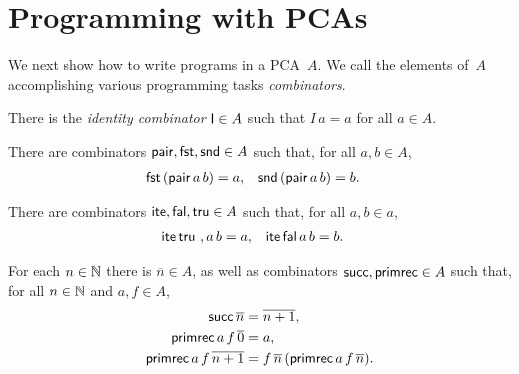 \section{Programming with PCAs}

We next show how to write programs in a PCA~$A$.
We call the elements of~$A$ accomplishing various programming tasks \emph{combinators}.

\begin{definition}[Identity]
  \label{def:combinator-I}
  \leanok
  There is the \emph{identity combinator} $\mathsf{I} \in A$ such that $I \, a = a$ for all $a \in A$.
\end{definition}

\begin{definition}[Pairing]
  \label{def:combinator-pairing}
  \leanok
  There are combinators $\mathsf{pair}, \mathsf{fst}, \mathsf{snd} \in A$ such that, for all $a, b \in A$,
  \begin{align*}
    \mathsf{fst}\, (\mathsf{pair}\,a\,b) &= a,
    &
    \mathsf{snd}\, (\mathsf{pair}\,a\,b) &= b.
  \end{align*}
\end{definition}

\begin{definition}[Booleans]
  \label{def:combinator-bool}
  There are combinators $\mathsf{ite} ,  \mathsf{fal}, \mathsf{tru} \in A$ such that, for all $a, b \in a$,
  \begin{align*}
    \mathsf{ite} \, \mathsf{tru} \ ,a \, b &= a,
    &
    \mathsf{ite} \, \mathsf{fal} \, a \, b &= b.
  \end{align*}
\end{definition}

\begin{definition}[Numerals]
  \label{def:combinator-nat}
  For each $n \in \mathbb{N}$ there is $\overline{n} \in A$, as well as combinators $\mathsf{succ}, \mathsf{primrec} \in A$
  such that, for all $n \in \mathbb{N}$ and $a, f \in A$,
  \begin{align*}
    \mathsf{succ} \, \overline{n} &= \overline{n+1},
    \\
    \mathsf{primrec} \, a \, f \, \overline{0} &= a,
    \\
    \mathsf{primrec} \, a \, f \, \overline{n+1} &= f \, \overline{n} \, (\mathsf{primrec} \, a \, f \, \overline{n}).
  \end{align*}
\end{definition}

